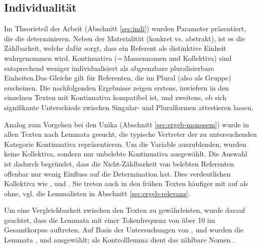 \subsection{Individualität}\label{sec:ergeb-individualität}

Im Theorieteil der Arbeit (Abschnitt \ref{sec:indi}) wurden Parameter präsentiert, die die   determinieren. Neben der Materialität (konkret vs. abstrakt), ist es die Zählbarkeit, welche dafür sorgt, dass ein Referent als distinktive Einheit wahrgenommen wird. Kontinuativa  (=\,Massennomen und Kollektiva) sind entsprechend weniger individualisiert als abgrenzbare pluralisierbare Einheiten.\linebreak Das Gleiche gilt für Referenten, die im Plural (also als Gruppe) erscheinen. Die nachfolgenden Ergebnisse zeigen erstens, inwiefern  in den einzelnen Texten mit Kontinuativa kompatibel ist, und zweitens, ob sich signifikante Unterschiede zwischen Singular- und Pluralformen attestieren lassen.


Analog zum Vorgehen bei den Unika  (Abschnitt \ref{sec:ergeb-monosem}) wurde in allen Texten nach Lemmata  gesucht, die typische Vertreter der zu untersuchenden Kategorie Kontinuativa repräsentieren. Um die Variable  auszublenden, wurden keine Kollektiva, sondern nur unbelebte Kontinuativa  ausgewählt. Die Auswahl ist dadurch begründet, dass die Nicht-Zählbarkeit von belebten Referenten offenbar nur wenig Einfluss auf die Determination hat. Dies verdeutlichen Kollektiva  wie ,  und  . Sie treten auch in den frühen Texten häufiger mit  auf als ohne, vgl. die Lemmalisten  in Abschnitt \ref{sec:ergeb-relevanz}. 

Um eine Vergleichbarkeit zwischen den Texten zu gewährleisten, wurde darauf geachtet, dass die Lemmata  mit einer Tokenfrequenz  von über 10 im Gesamtkorpus  auftreten. Auf Basis der Untersuchungen von \textcite[28--29]{Graf1905}, \textcite[27--28]{Bell1907} und  \textcite[464]{Oubouzar1989} wurden die Lemmata   ,   und    ausgewählt; als Kontrolllemma  dient das zählbare Nomen  . 

